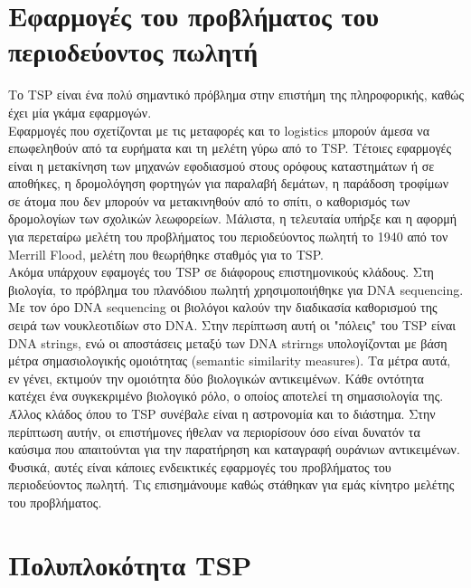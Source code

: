 \documentclass[oneside,12pt]{book}
\theoremstyle{definition}
\begin{document}
\chapter{Εφαρμογές του προβλήματος του περιοδεύοντος πωλητή}

Το TSP είναι ένα πολύ σημαντικό πρόβλημα στην επιστήμη της πληροφορικής, καθώς έχει μία γκάμα εφαρμογών. \\

Εφαρμογές που σχετίζονται με τις μεταφορές και το logistics μπορούν άμεσα να επωφεληθούν από τα ευρήματα και τη μελέτη γύρω από το TSP. Τέτοιες εφαρμογές είναι η μετακίνηση των μηχανών εφοδιασμού στους ορόφους καταστημάτων ή σε αποθήκες, η δρομολόγηση φορτηγών για παραλαβή δεμάτων, η παράδοση τροφίμων σε άτομα που δεν μπορούν να μετακινηθούν από το σπίτι, ο καθορισμός των δρομολογίων των σχολικών λεωφορείων. Μάλιστα, η τελευταία υπήρξε και η αφορμή για περεταίρω μελέτη του προβλήματος του περιοδεύοντος πωλητή το 1940 από τον Merrill Flood, μελέτη που θεωρήθηκε σταθμός για το TSP. \\

Ακόμα υπάρχουν εφαμογές του TSP σε διάφορους επιστημονικούς κλάδους. Στη βιολογία, το πρόβλημα του πλανόδιου πωλητή χρησιμοποιήθηκε για DNA sequencing. Με τον όρο DNA sequencing οι βιολόγοι καλούν την διαδικασία καθορισμού της σειρά των νουκλεοτιδίων στο DNA. Στην περίπτωση αυτή οι "πόλεις" του TSP είναι DNA strings, ενώ οι αποστάσεις μεταξύ των DNA strirngs υπολογίζονται με βάση μέτρα σημασιολογικής ομοιότητας (semantic similarity measures). Τα μέτρα αυτά, εν γένει, εκτιμούν την ομοιότητα δύο βιολογικών αντικειμένων.  Κάθε οντότητα κατέχει ένα συγκεκριμένο βιολογικό ρόλο, ο οποίος αποτελεί τη σημασιολογία της. \\

Άλλος κλάδος όπου το TSP συνέβαλε είναι η αστρονομία και το διάστημα. Στην περίπτωση αυτήν, οι επιστήμονες ήθελαν να περιορίσουν όσο είναι δυνατόν τα καύσιμα που απαιτούνται για την παρατήρηση και καταγραφή ουράνιων αντικειμένων. \\

Φυσικά, αυτές είναι κάποιες ενδεικτικές εφαρμογές του προβλήματος του περιοδεύοντος πωλητή. Τις επισημάνουμε καθώς στάθηκαν για εμάς κίνητρο μελέτης του προβλήματος. \\

\chapter{Πολυπλοκότητα TSP}
\end{document}
